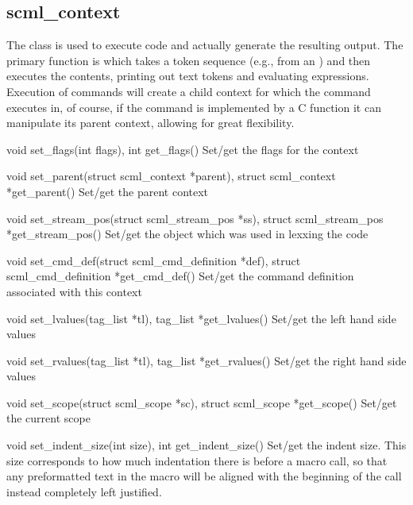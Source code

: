 \subsection{scml\_context}

The  class is used to execute \SCML{} code and actually
generate the resulting output.  The primary function is
 which takes a token sequence (e.g., from an
) and then executes the contents, printing out
text tokens and evaluating expressions.  Execution of \SCML{} commands will create
a child context for which the command executes in, of course, if the command is
implemented by a C function it can manipulate its parent context, allowing for
great flexibility.

\begin{cprototypelist}
  \item[void set_flags(int flags), int get_flags()] Set/get the
  flags for the context

  \item[void set_parent(struct scml_context *parent), struct
  scml_context *get_parent()] Set/get the parent context

  \item[void set_stream_pos(struct scml_stream_pos *ss), struct
  scml_stream_pos *get_stream_pos()] Set/get the 
  object which was used in lexxing the code

  \item[void set_cmd_def(struct scml_cmd_definition *def), struct
  scml_cmd_definition *get_cmd_def()] Set/get the command definition
  associated with this context

  \item[void set_lvalues(tag_list *tl), tag_list *get_lvalues()]
  Set/get the left hand side values

  \item[void set_rvalues(tag_list *tl), tag_list *get_rvalues()]
  Set/get the right hand side values

  \item[void set_scope(struct scml_scope *sc), struct scml_scope
  *get_scope()] Set/get the current scope

  \item[void set_indent_size(int size), int get_indent_size()] Set/get the
  indent size.  This size corresponds to how much indentation there is before a
  macro call, so that any preformatted text in the macro will be aligned with
  the beginning of the call instead completely left justified.


\end{cprototypelist}
